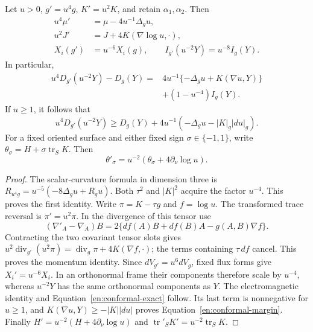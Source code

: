 \begin{lemma}\label{en:conformal}
Let $u>0$, $g'=u^4g$, $K'=u^2K$, and retain $\alpha_1,\alpha_2$.
Then
\begin{equation}\label{en:conformal-constraints}
 \begin{split}
 u^4\mu'&=\mu-4u^{-1}\Delta_g u,\\
 u^2J'&=J+4K(\nabla\log u,\cdot),\\
 X_i(g')&=u^{-6}X_i(g),\qquad
 I_{g'}(u^{-2}Y)=u^{-8}I_g(Y).
 \end{split}
\end{equation}
In particular,
\begin{equation}\label{en:conformal-exact}
 \begin{split}
 u^4D_{g'}(u^{-2}Y)-D_g(Y)
 ={}&4u^{-1}\{-\Delta_g u+K(\nabla u,Y)\}\\
    &+(1-u^{-4})I_g(Y).
 \end{split}
\end{equation}
If $u\geq1$, it follows that
\begin{equation}\label{en:conformal-margin}
 u^4D_{g'}(u^{-2}Y)
 \geq D_g(Y)+4u^{-1}(-\Delta_g u-|K|_g|du|_g).
\end{equation}
For a fixed oriented surface and either fixed sign $\sigma\in\{-1,1\}$,
write $\theta_\sigma=H+\sigma\operatorname{tr}_S K$. Then
\begin{equation}\label{en:conformal-expansion}
 \theta'_\sigma=u^{-2}(\theta_\sigma+4\partial_\nu\log u).
\end{equation}
\end{lemma}

\begin{proof}
The scalar-curvature formula in dimension three is
$R_{u^4g}=u^{-5}(-8\Delta_g u+R_gu)$. Both $\tau^2$ and
$|K|^2$ acquire the factor $u^{-4}$. This proves the first identity.
Write $\pi=K-\tau g$ and $f=\log u$. The transformed trace reversal
is $\pi'=u^2\pi$. In the divergence of this tensor use
\[
 (\nabla'_A-\nabla_A)B
 =2\{df(A)B+df(B)A-g(A,B)\nabla f\}.
\]
Contracting the two covariant tensor slots gives
$u^2\operatorname{div}_{g'}(u^2\pi)
=\operatorname{div}_g\pi+4K(\nabla f,\cdot)$; the terms
containing $\tau\,df$ cancel. This proves the momentum identity.
Since $dV_{g'}=u^6dV_g$, fixed flux forms give $X_i'=u^{-6}X_i$.
In an orthonormal frame their components therefore scale by $u^{-4}$,
whereas $u^{-2}Y$ has the same orthonormal components as $Y$.
The electromagnetic identity and Equation~\ref{en:conformal-exact}
follow. Its last term is nonnegative for $u\geq1$, and
$K(\nabla u,Y)\geq-|K||du|$ proves
Equation~\ref{en:conformal-margin}. Finally
$H'=u^{-2}(H+4\partial_\nu\log u)$ and
$\operatorname{tr}'_S K'=u^{-2}\operatorname{tr}_S K$.
\end{proof}

